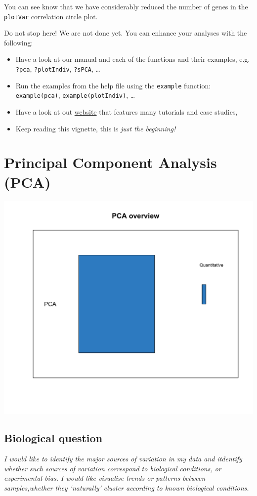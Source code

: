 \documentclass[]{book}
\theoremstyle{definition}
\theoremstyle{definition}
\theoremstyle{definition}
\theoremstyle{remark}
\begin{document}
You can see know that we have considerably reduced the number of genes
in the \texttt{plotVar} correlation circle plot.

Do not stop here! We are not done yet. You can enhance your analyses
with the following:

\begin{itemize}
\item
  Have a look at our manual and each of the functions and their
  examples, e.g. \texttt{?pca}, \texttt{?plotIndiv}, \texttt{?sPCA},
  \ldots{}
\item
  Run the examples from the help file using the \texttt{example}
  function: \texttt{example(pca)}, \texttt{example(plotIndiv)}, \ldots{}
\item
  Have a look at out \href{http://www.mixomics.org}{website} that
  features many tutorials and case studies,
\item
  Keep reading this vignette, this is \emph{just the beginning!}
\end{itemize}

\chapter{Principal Component Analysis (PCA)}\label{pca}

\begin{center}\includegraphics[width=0.5\linewidth]{Figures/overview-PCA-1} \end{center}

\section{Biological question}\label{biological-question}

{ \emph{I would like to identify the major sources of variation in my
data and itdentify whether such sources of variation correspond to
biological conditions, or experimental bias. I would like visualise
trends or patterns between samples,whether they `naturally' cluster
according to known biological conditions.} }
\end{document}
